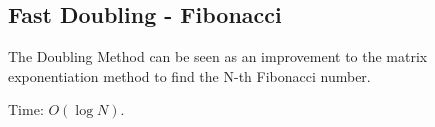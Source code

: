 \subsection{Fast Doubling - Fibonacci}

The Doubling Method can be seen as an improvement to the matrix exponentiation method to find the N-th Fibonacci number.

Time: $O(\log N)$.
